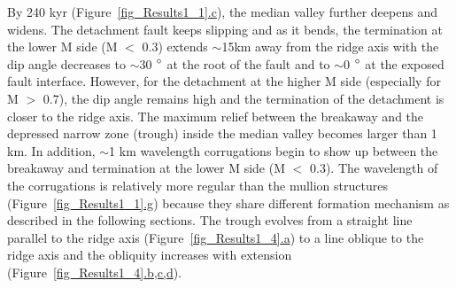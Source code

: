 
By 240 kyr (Figure~\hyperref[fig_Results1_1]{\ref{fig_Results1_1}.c}), the median valley further deepens and widens. The detachment fault keeps slipping and as it bends, the termination at the lower M side (M $<$ 0.3) extends $\sim$15km away from the ridge axis with the dip angle decreases to $\sim$30 $\degree$ at the root of the fault and to $\sim$0 $\degree$ at the exposed fault interface. However, for the detachment at the higher M side (especially for M $>$ 0.7), the dip angle remains high and the termination of the detachment is closer to the ridge axis. The maximum relief between the breakaway and the depressed narrow zone (trough) inside the median valley becomes larger than 1 km. In addition, $\sim$1 km wavelength corrugations begin to show up between the breakaway and termination at the lower M side (M $<$ 0.3). The wavelength of the corrugations is relatively more regular than the mullion structures (Figure~\hyperref[fig_Results1_1]{\ref{fig_Results1_1}.g}) because they share different formation mechanism as described in the following sections. The trough evolves from a straight line parallel to the ridge axis (Figure~\hyperref[fig_Results1_4]{\ref{fig_Results1_4}.a}) to a line oblique to the ridge axis and the obliquity increases with extension (Figure~\hyperref[fig_Results1_4]{\ref{fig_Results1_4}.b,c,d}). 

